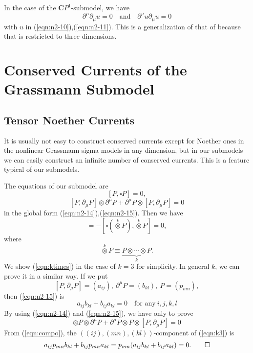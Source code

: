 \documentclass[makeidx,12pt,openany]{report}
\begin{document}
In the case of the ${\mathbf{C}}P^1$-submodel, we have
\begin{equation}
 \partial^{\mu}\partial_{\mu}u=0 \quad \mbox{and} \quad 
 \partial^{\mu}u\partial_{\mu}u=0
\end{equation}
with $u$ in (\ref{eqn:n2-10}),(\ref{eqn:n2-11}). This is a generalization of 
that of \cite{AFG1} because that is restricted to three dimensions. 
\chapter{Conserved Currents of the Grassmann Submodel}
 \section{Tensor Noether Currents}
It is usually not easy to construct conserved currents except for Noether ones in the nonlinear Grassmann sigma models in any dimension, but in our submodels we can easily construct an infinite number of conserved currents. This is a feature typical of our submodels. 

The equations of our submodel are
$$
 [P,\square P]=0,
$$
$$
 [P,\partial_{\mu}P] \otimes \partial^{\mu}P 
 +\partial^{\mu}P \otimes [P,\partial_{\mu}P]=0
$$
in the global form (\ref{eqn:n2-14}),(\ref{eqn:n2-15}). Then we have 
\begin{equation}
 [\stackrel{k}{\otimes} \! P,\square (\stackrel{k}{\otimes} \! P)]
 =-[\square (\stackrel{k}{\otimes} \! P), \stackrel{k}{\otimes} \! P]=0, 
 \label{eqn:ktimes}
\end{equation}
where
\begin{equation}
 \stackrel{k}{\otimes} \! P \equiv \underbrace{P \otimes \cdots \otimes P}_k.
\end{equation}
We show (\ref{eqn:ktimes}) in the case of $k=3$ for simplicity. In 
general $k$, we can prove it in a similar way. 
If we put 
$$
[P,\partial_{\mu}P]=(a_{ij}), \ \partial^{\mu}P=(b_{kl}), \ P=(p_{mn}), 
$$
then (\ref{eqn:n2-15}) is 
\begin{equation}
 a_{ij}b_{kl}+b_{ij}a_{kl}=0 \quad \mbox{for any} \ i,j,k,l
 \label{eqn:compo}
\end{equation}
By using (\ref{eqn:n2-14}) and (\ref{eqn:n2-15}), we have only to prove 
\begin{equation}
[P,\partial_{\mu}P] \otimes P \otimes \partial^{\mu}P 
 +\partial^{\mu}P \otimes P \otimes [P,\partial_{\mu}P]=0
 \label{eqn:k3}
\end{equation}
{}From (\ref{eqn:compo}), 
the $((ij),(mn),(kl))$-component of (\ref{eqn:k3}) is 
$$
a_{ij}p_{mn}b_{kl}+b_{ij}p_{mn}a_{kl}
=p_{mn}(a_{ij}b_{kl}+b_{ij}a_{kl})=0. \qed
$$
\end{document}
